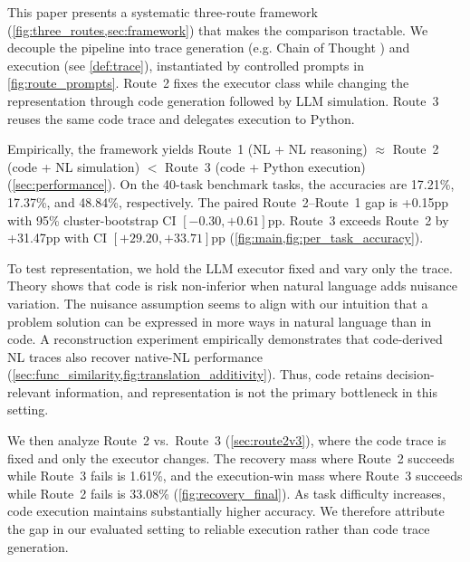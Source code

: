 This paper presents a systematic three-route framework (\cref{fig:three_routes,sec:framework}) that makes the comparison tractable. We decouple the pipeline into trace generation (e.g. Chain of Thought \cite{wei2022chain}) and execution (see \cref{def:trace}), instantiated by controlled prompts in \cref{fig:route_prompts}. Route~2 fixes the executor class while changing the representation through code generation followed by LLM simulation. Route~3 reuses the same code trace and delegates execution to Python.

\smallskip
Empirically, the framework yields Route~1 (NL + NL reasoning) $\approx$ Route~2 (code + NL simulation) $<$ Route~3 (code + Python execution) (\cref{sec:performance}). On the 40-task benchmark tasks, the accuracies are 17.21\%, 17.37\%, and 48.84\%, respectively. The paired Route~2--Route~1 gap is +0.15pp with 95\% cluster-bootstrap CI $[-0.30,+0.61]$pp. Route~3 exceeds Route~2 by +31.47pp with CI $[+29.20,+33.71]$pp (\cref{fig:main,fig:per_task_accuracy}).

\smallskip
To test representation, we hold the LLM executor fixed and vary only the trace. Theory shows that code is risk non-inferior when natural language adds nuisance variation. The nuisance assumption seems to align with our intuition that a problem solution can be expressed in more ways in natural language than in code. A reconstruction experiment empirically demonstrates that code-derived NL traces also recover native-NL performance (\cref{sec:func_similarity,fig:translation_additivity}). Thus, code retains decision-relevant information, and representation is not the primary bottleneck in this setting.


\smallskip
We then analyze Route~2 vs.\ Route~3 (\cref{sec:route2v3}), where the code trace is fixed and only the executor changes. The recovery mass where Route~2 succeeds while Route~3 fails is 1.61\%, and the execution-win mass where Route~3 succeeds while Route~2 fails is 33.08\% (\cref{fig:recovery_final}). As task difficulty increases, code execution maintains substantially higher accuracy. We therefore attribute the gap in our evaluated setting to reliable execution rather than code trace generation.




